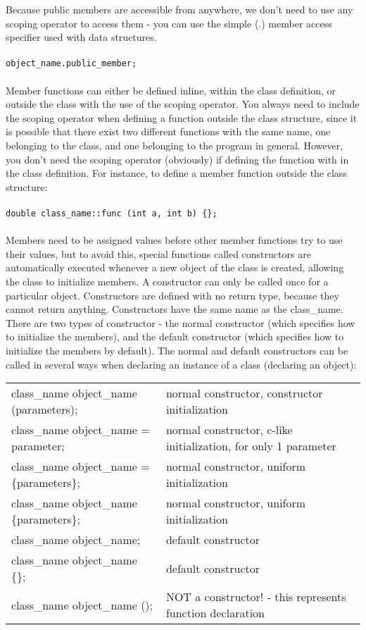 \documentclass[10pt]{article}
\begin{document}
\begin{flushleft}
Because public members are accessible from anywhere, we don't need to use any scoping operator to access them - you can use the simple (.) member access specifier used with data structures.\\
\\
\color{red}\texttt{object\_name.public\_member;}\color{black}\\
\\
Member functions can either be defined inline, within the class definition, or outside the class with the use of the scoping operator. You always need to include the scoping operator when defining a function outside the class structure, since it is possible that there exist two different functions with the same name, one belonging to the class, and one belonging to the program in general. However, you don't need the scoping operator (obviously) if defining the function with in the class definition. For instance, to define a member function outside the class structure:\\
\\
\color{red}\texttt{double class\_name::func (int a, int b) \{\};}\color{black}\\
\\
Members need to be assigned values before other member functions try to use their values, but to avoid this, special functions called constructors are automatically executed whenever a new object of the class is created, allowing the class to initialize members. A constructor can only be called once for a particular object. Constructors are defined with no return type, because they cannot return anything. Constructors have the same name as the class\_name. There are two types of constructor - the normal constructor (which specifies how to initialize the members), and the default constructor (which specifies how to initialize the members by default). The normal and default constructors can be called in several ways when declaring an instance of a class (declaring an object):

\begin{center}
\begin{tabular}{l l}
class\_name object\_name (parameters); & normal constructor, constructor initialization\\
class\_name object\_name = parameter; & normal constructor, c-like initialization, for only 1 parameter\\
class\_name object\_name = \{parameters\}; & normal constructor, uniform initialization\\
class\_name object\_name \{parameters\}; & normal constructor, uniform initialization\\
class\_name object\_name; & default constructor\\
class\_name object\_name \{\}; & default constructor\\
class\_name object\_name (); & NOT a constructor! - this represents function declaration\\
\end{tabular}
\end{center}


\end{flushleft}
\end{document}
